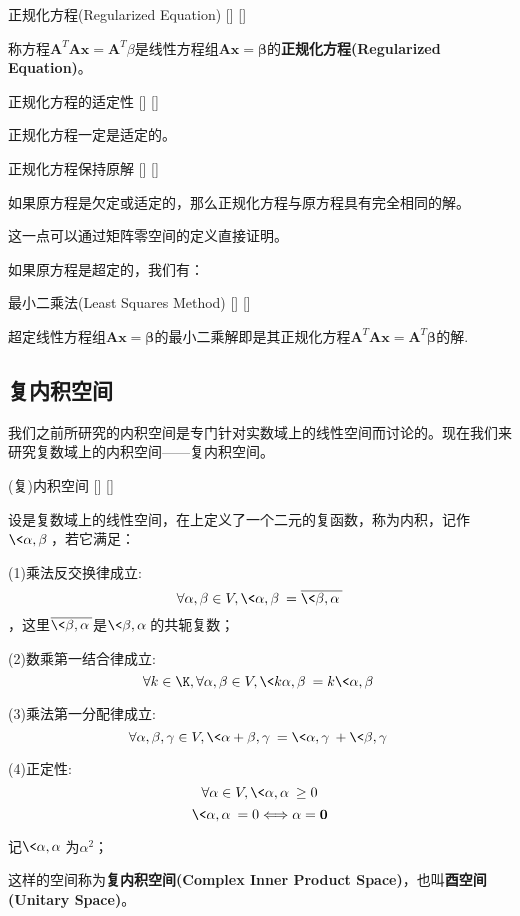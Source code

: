 \documentclass[UTF8]{ctexart}
\begin{document}
		\begin{dfn}
			[]
			{正规化方程(Regularized Equation)}
			[]
			[]

			称方程$\bm{A}^T\bm{A} \bm{x}=\bm{A}^T\beta$是线性方程组$\bm{A}\bm{x}=\bm{\beta}$的\textbf{正规化方程(Regularized Equation)}。
		\end{dfn}

		\begin{ppt}
			[]
			{正规化方程的适定性}
			[]
			[]

			正规化方程一定是适定的。
		\end{ppt}

		\begin{ppt}
			[]
			{正规化方程保持原解}
			[]
			[]

			如果原方程是欠定或适定的，那么正规化方程与原方程具有完全相同的解。
		\end{ppt}

		\begin{prf}
			这一点可以通过矩阵零空间的定义直接证明。
		\end{prf}
		
		如果原方程是超定的，我们有：
				
		\begin{thm}
			[]
			{最小二乘法(Least Squares Method)}
			[]
			[]
			
			超定线性方程组$\bm{A}\bm{x}=\bm{\beta}$的最小二乘解即是其正规化方程$\bm{A}^T\bm{A}\bm{x}=\bm{A}^T\bm{\beta}$的解. 
		\end{thm}

	\subsection{复内积空间}

		我们之前所研究的内积空间是专门针对实数域上的线性空间而讨论的。现在我们来研究复数域上的内积空间——复内积空间。

		\begin{dfn}
			[]
			{(复)内积空间}
			[]
			[]

			设是复数域上的线性空间，在上定义了一个二元的复函数，称为内积，记作$\<\alpha,\beta\>$，若它满足：

			(1)乘法反交换律成立: 
			\[\forall\alpha,\beta\in V, \<\alpha,\beta\>=\overline{\<\beta,\alpha\>} \]，这里\(\overline{\<\beta,\alpha\>}\)是\(\<\beta,\alpha\>\)的共轭复数；
			
			(2)数乘第一结合律成立: 
			\[\forall k\in\K, \forall \alpha,\beta\in V, \<k\alpha,\beta\>=k\<\alpha,\beta\>\]
			
			(3)乘法第一分配律成立: 
			\[\forall\alpha,\beta,\gamma\in V, \<\alpha+\beta,\gamma\>=\<\alpha,\gamma\>+\<\beta,\gamma\>\]
			
			(4)正定性: 
			\[\forall \alpha\in V, \<\alpha,\alpha\>\geq 0\]
			\[\<\alpha,\alpha\>=0\Longleftrightarrow \alpha=\mathbf{0}\]
			
			记$\<\alpha,\alpha\>$为$\alpha^2$； 

			这样的空间称为\textbf{复内积空间(Complex Inner Product Space)}，也叫\textbf{酉空间(Unitary Space)}。
		\end{dfn}
\end{document}
